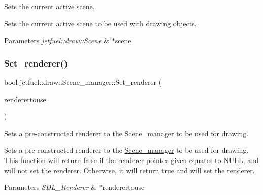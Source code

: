 Sets the current active scene. 

Sets the current active scene to be used with drawing objects.


\begin{DoxyParams}{Parameters}
{\em \hyperlink{classjetfuel_1_1draw_1_1Scene}{jetfuel\+::draw\+::\+Scene}} & $\ast$scene \\
\hline
\end{DoxyParams}
\mbox{\label{classjetfuel_1_1draw_1_1Scene__manager_ac74ac2f84b41a181fe1c3814ee9a602f}} 
\subsubsection{\texorpdfstring{Set\+\_\+renderer()}{Set\_renderer()}}
{\footnotesize\ttfamily bool jetfuel\+::draw\+::\+Scene\+\_\+manager\+::\+Set\+\_\+renderer (\begin{DoxyParamCaption}\item[{S\+D\+L\+\_\+\+Renderer $\ast$}]{renderertouse }\end{DoxyParamCaption})}



Sets a pre-\/constructed renderer to the \hyperlink{classjetfuel_1_1draw_1_1Scene__manager}{Scene\+\_\+manager} to be used for drawing. 

Sets a pre-\/constructed renderer to the \hyperlink{classjetfuel_1_1draw_1_1Scene__manager}{Scene\+\_\+manager} to be used for drawing. This function will return false if the renderer pointer given equates to N\+U\+LL, and will not set the renderer. Otherwise, it will return true and will set the renderer.


\begin{DoxyParams}{Parameters}
{\em S\+D\+L\+\_\+\+Renderer} & $\ast$renderertouse \\
\hline
\end{DoxyParams}
\mbox{\label{classjetfuel_1_1draw_1_1Scene__manager_afb917b4617be734b81c66c3618eb16dd}} 

